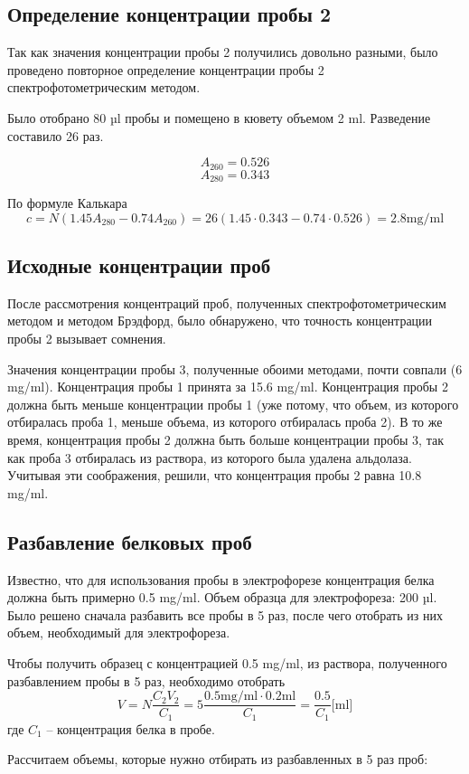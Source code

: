 \subsection{Определение концентрации пробы 2}
Так как значения концентрации пробы 2 получились довольно разными,
было проведено повторное определение концентрации пробы 2 спектрофотометрическим методом.

Было отобрано 80 µl пробы и помещено в кювету объемом 2 ml.
Разведение составило 26 раз.

$$ A_{260} = 0.526 $$
$$ A_{280} = 0.343 $$

По формуле Калькара
$$ c = N (1.45 A_{280} - 0.74 A_{260}) = 26 (1.45 \cdot 0.343 - 0.74 \cdot 0.526) = 2.8 \text{mg/ml}$$

\subsection{Исходные концентрации проб}
После рассмотрения концентраций проб, полученных спектрофотометрическим методом
и методом Брэдфорд, было обнаружено, что точность концентрации пробы 2 вызывает
сомнения.

Значения концентрации пробы 3, полученные обоими методами, почти совпали (6 mg/ml).
Концентрация пробы 1 принята за 15.6 mg/ml.
Концентрация пробы 2 должна быть меньше концентрации пробы 1
(уже потому, что объем, из которого отбиралась проба 1,
меньше объема, из которого отбиралась проба 2).
В то же время, концентрация пробы 2 должна быть больше концентрации пробы 3,
так как проба 3 отбиралась из раствора, из которого была удалена альдолаза.
Учитывая эти соображения, решили, что концентрация пробы 2 равна 10.8 mg/ml.

\subsection{Разбавление белковых проб}
Известно, что для использования пробы в электрофорезе концентрация
белка должна быть примерно 0.5 mg/ml.
Объем образца для электрофореза: 200 µl.
Было решено сначала разбавить все пробы в 5 раз, после чего
отобрать из них объем, необходимый для электрофореза.

Чтобы получить образец с концентрацией 0.5 mg/ml,
из раствора, полученного разбавлением пробы в 5 раз,
необходимо отобрать
$$ V = N \frac{C_2 V_2}{C_1} = 5 \frac{0.5 \text{mg/ml} \cdot 0.2 \text{ml}}{C_1} = \frac{0.5}{C_1} \text{[ml]} $$
где $C_1$ -- концентрация белка в пробе.

Рассчитаем объемы, которые нужно отбирать из разбавленных в 5 раз проб:

